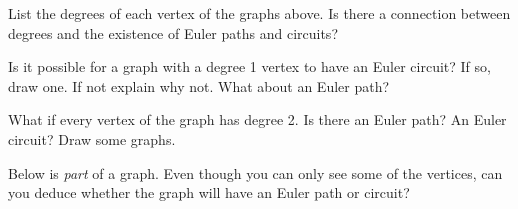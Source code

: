 \documentclass[12pt]{article}
\begin{document}
\begin{activity}
\begin{questions}
\question List the degrees of each vertex of the graphs above.  Is there a connection between degrees and the existence of Euler paths and circuits?

%
%


\question Is it possible for a graph with a degree 1 vertex to have an Euler circuit?  If so, draw one.  If not explain why not.  What about an Euler path?


\question What if every vertex of the graph has degree 2.  Is there an Euler path?  An Euler circuit?  Draw some graphs.


\question Below is {\em part} of a graph.  Even though you can only see some of the vertices, can you deduce whether the graph will have an Euler path or circuit?

\begin{center}

\end{center}
\end{questions}
\end{activity}
\end{document}
